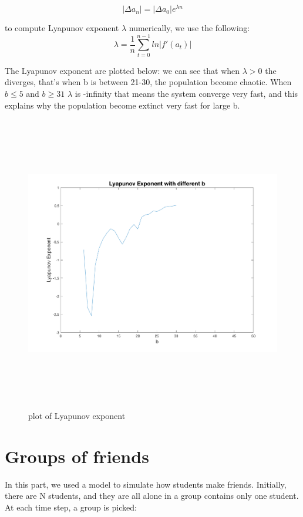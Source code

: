 \documentclass[12pt]{article}
\begin{document}
\begin{equation}
	|\Delta a_{n}| = |\Delta a_{0}| e^{\lambda n}
\end{equation}

to compute Lyapunov exponent $\lambda$ numerically, we use the following:
\begin{equation}
	\lambda = \frac{1}{n} \sum_{t=0}^{n-1} ln |f'(a_{t})|
\end{equation}

The Lyapunov exponent are plotted below: we can see that when $\lambda > 0$ the diverges, that's when b is between 21-30, the population become chaotic. When $b \leq 5$ and $b \geq 31$ $\lambda$ is -infinity that means the system converge very fast, and this explains why the population become extinct very fast for large b. 

\begin{figure}[H] %
\centering
\includegraphics[width = 16 cm, height = 13cm]{lyapunov_exp.png}
\caption{plot of Lyapunov exponent}
\label{fig:p1q1lya}
\end{figure}



\newpage
\section{Groups of friends}
\doublespacing
In this part, we used a model to simulate how students make friends. Initially, there are N students, and they are all alone in a group contains only one student. At each time step, a group is picked:
\end{document}

